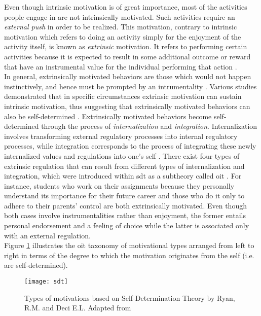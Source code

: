 Even though intrinsic motivation is of great importance, most of the activities people engage in are not intrinsically motivated. Such activities require an \textit{external push} in order to be realized. This motivation, contrary to intrinsic motivation which refers to doing an activity simply for the enjoyment of the activity itself, is known as \textit{extrinsic} motivation. It refers to performing certain activities because it is expected to result in some additional outcome or reward that have an instrumental value for the individual performing that action \cite{ryan2000self}. \\In general, extrinsically motivated behaviors are those which would not happen instinctively, and hence must be prompted by an intrumentality \cite{deci1994promoting}. Various studies demonstrated that in specific circumstances extrinsic motivation can sustain intrinsic motivation, thus suggesting that extrinsically motivated behaviors can also be self-determined \cite{deci1994promoting}. Extrinsically motivated behaviors become self-determined through the process of \textit{internalization} and \textit{integration}. Internalization involves transforming external regulatory processes into internal regulatory processes, while integration corresponds to the process of integrating these newly internalized values and regulations into one's self \cite{deci1994promoting}. There exist four types of extrinsic regulation that can result from different types of internalization and integration, which were introduced within \acrshort{sdt} as a subtheory called \acrfull{oit} \cite{deci1994promoting, ryan2000intrinsic, ryan2000self}. For instance, students who work on their assignments because they personally understand its importance for their future career and those who do it only to adhere to their parents' control are both extrinsically motivated. Even though both cases involve instrumentalities rather than enjoyment, the former entails personal endorsement and a feeling of choice while the latter is associated only with an external regulation.\\
Figure \ref{fig:tax} illustrates the \acrshort{oit} taxonomy of motivational types arranged from left to right in terms of the degree to which the motivation originates from the self (i.e. are self-determined).\\ 
\begin{figure}[h]
    \centering
    \texttt{[image: sdt]}
    \caption[Types of Motivations]{Types of motivations based on Self-Determination  Theory by Ryan, R.M. and Deci E.L. Adapted from  \cite{ryan2000intrinsic}}
    \label{fig:tax}
\end{figure}\\
